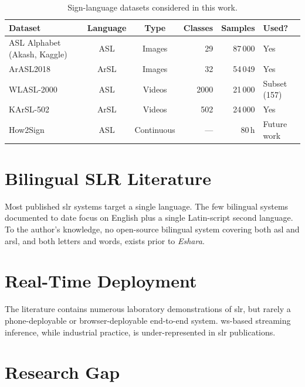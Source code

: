\begin{table}[H]\centering
  \caption{Sign-language datasets considered in this work.}\label{tab:datasets}
  \begin{tabularx}{\textwidth}{l c c r r X}\toprule
    Dataset & Language & Type & Classes & Samples & Used? \\\midrule
    ASL Alphabet (Akash, Kaggle) & ASL  & Images & 29   & 87\,000  & Yes \\
    ArASL2018                    & ArSL & Images & 32   & 54\,049  & Yes \\
    WLASL-2000~\cite{li2020wlasl}& ASL  & Videos & 2000 & 21\,000  & Subset (157) \\
    KArSL-502~\cite{sidig2021karsl}& ArSL & Videos & 502  & 24\,000  & Yes \\
    How2Sign~\cite{duarte2021how2sign}& ASL & Continuous & --- & 80\,h & Future work \\\bottomrule
  \end{tabularx}
\end{table}

\section{Bilingual SLR Literature}
\label{sec:lit:bilingual}

Most published \gls{slr} systems target a single language. The few
bilingual systems documented to date focus on English plus a single
Latin-script second language. To the author's knowledge, no
open-source bilingual system covering both \gls{asl} and \gls{arsl}, and
both letters and words, exists prior to \emph{Eshara}.

\section{Real-Time Deployment}
\label{sec:lit:deploy}

The literature contains numerous laboratory demonstrations of \gls{slr},
but rarely a phone-deployable or browser-deployable end-to-end system.
\gls{ws}-based streaming inference, while industrial practice, is
under-represented in \gls{slr} publications.

\section{Research Gap}
\label{sec:lit:gap}

